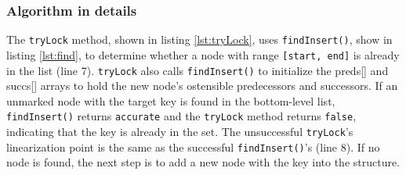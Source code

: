 \vspace{15pt}

    
\begin{figure}[!p]
    \centering
    
\end{figure}

\subsubsection*{Algorithm in details}
The \texttt{tryLock} method, shown in listing \ref{lst:tryLock}, uses \texttt{findInsert()}, show in listing \ref{lst:find}, to determine whether a node with range \texttt{[start, end]} is already in the list (line 7). \texttt{tryLock} also calls \texttt{findInsert()} to initialize the preds[] and succs[] arrays to hold the new node's ostensible predecessors and successors.
If an unmarked node with the target key is found in the bottom-level list, \texttt{findInsert()} returns \texttt{accurate} and the \texttt{tryLock} method returns \texttt{false}, indicating that the key is already in the set. The unsuccessful \texttt{tryLock}'s linearization point is the same as the successful \texttt{findInsert()}'s (line 8). If no node is found, the next step is to add a new node with the key into the structure.

